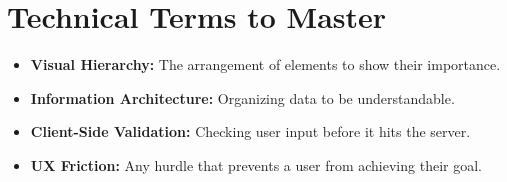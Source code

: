 \documentclass[12pt]{article}
\begin{document}
\section{Technical Terms to Master}
\begin{itemize}
    \item \textbf{Visual Hierarchy:} The arrangement of elements to show their importance.
    \item \textbf{Information Architecture:} Organizing data to be understandable.
    \item \textbf{Client-Side Validation:} Checking user input before it hits the server.
    \item \textbf{UX Friction:} Any hurdle that prevents a user from achieving their goal.
\end{itemize}
\end{document}
